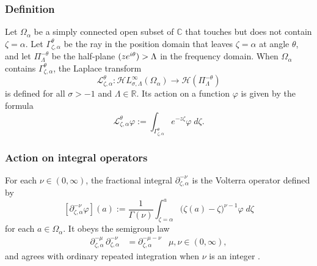 \documentclass{article}
\theoremstyle{definition}
\theoremstyle{plain}
\newcommand{\maps}{\colon}
\newcommand{\R}{\mathbb{R}}
\newcommand{\C}{\mathbb{C}}
\let\Re\relax
\DeclareMathOperator{\Re}{Re}
\newcommand{\laplace}{\mathcal{L}}
\newcommand{\fracderiv}[3]{\partial^{#1}_{#2, #3}}
\newcommand{\holo}{\mathcal{H}}
\newcommand{\singexp}[2]{\mathcal{H}L^\infty_{#1, #2}}
\newcommand{\domain}{\Omega}
\begin{document}
\subsubsection{Definition}\label{sec:definition_Laplace}
Let $\domain_\alpha$ be a simply connected open subset of $\C$ that touches but does not contain $\zeta=\alpha$. Let $\Gamma_{\zeta, \alpha}^\theta$ be the ray in the position domain that leaves $\zeta=\alpha$ at angle $\theta$, and let $\Pi^{-\theta}_\Lambda$ be the half-plane $\Re(z e^{i\theta}) > \Lambda$ in the frequency domain. When $\domain_\alpha$ contains $\Gamma_{\zeta, \alpha}^\theta$, the Laplace transform
\[ \laplace_{\zeta, \alpha}^{\theta} \maps \singexp{\sigma}{\Lambda}(\domain_\alpha) \to \holo(\Pi^{-\theta}_\Lambda) \]
is defined for all $\sigma > -1$ and $\Lambda \in \R$. Its action on a function $\varphi$ is given by the formula
\begin{equation}\label{laplace:int}
\laplace_{\zeta, \alpha}^{\theta} \varphi := \int_{\Gamma_{\zeta,\alpha}^\theta} e^{-z\zeta} \varphi\;d\zeta.
\end{equation}

\subsubsection{Action on integral operators}\label{sec:L-int-op}
For each $\nu \in (0, \infty)$, the fractional integral $\partial^{-\nu}_{\zeta, \alpha}$ is the Volterra operator defined by
\[ [\partial^{-\nu}_{\zeta, \alpha} \varphi](a) := \frac{1}{\Gamma(\nu)} \int_{\zeta = \alpha}^a \big(\zeta(a)-\zeta\big)^{\nu-1} \varphi\;d\zeta \]
for each $a \in \domain_\alpha$. It obeys the semigroup law \cite[Section~1.3]{mladenov2014advanced}
\begin{align*}
\fracderiv{-\mu}{\zeta}{\alpha}\,\fracderiv{-\nu}{\zeta}{\alpha} & = \fracderiv{-\mu-\nu}{\zeta}{\alpha} & \mu, \nu \in (0, \infty),
\end{align*}
and agrees with ordinary repeated integration when $\nu$ is an integer \cite[equation~35]{mladenov2014advanced}.
\end{document}
